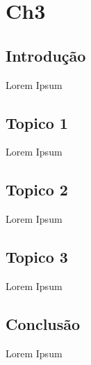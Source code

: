 \chapter{Ch3}
\label{chap:tecno-ferra}

\section{Introdução}
\label{chap3:sec:intro}

Lorem Ipsum

\section{Topico 1}
\label{chap3:sec:...}

Lorem Ipsum
\section{Topico 2}
\label{chap3:sec:concs}

Lorem Ipsum

\section{Topico 3}
\label{chap3:sec:concs}

Lorem Ipsum

\section{Conclusão}
\label{chap3:sec:concs}

Lorem Ipsum